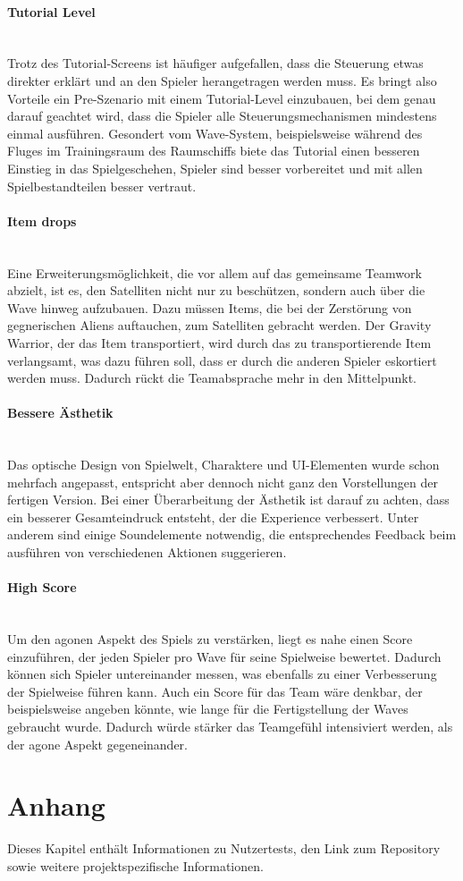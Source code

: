 \documentclass[11pt]{scrartcl}
\newcommand{\lbparagraph}[1]{\paragraph*{#1}\mbox{}\\}
\begin{document}
\lbparagraph{Tutorial Level}
Trotz des Tutorial-Screens ist häufiger aufgefallen, dass die Steuerung etwas direkter erklärt und an den Spieler
herangetragen werden muss. Es bringt also Vorteile ein Pre-Szenario mit einem Tutorial-Level einzubauen,
bei dem genau darauf geachtet wird, dass die Spieler alle Steuerungsmechanismen mindestens einmal ausführen.
Gesondert vom Wave-System, beispielsweise während des Fluges im Trainingsraum des Raumschiffs biete das Tutorial
einen besseren Einstieg in das Spielgeschehen, Spieler sind besser vorbereitet und mit allen Spielbestandteilen
besser vertraut.

\lbparagraph{Item drops}
Eine Erweiterungsmöglichkeit, die vor allem auf das gemeinsame Teamwork abzielt, ist es,
den Satelliten nicht nur zu beschützen, sondern auch über die Wave hinweg aufzubauen. Dazu
müssen Items, die bei der Zerstörung von gegnerischen Aliens auftauchen, zum Satelliten
gebracht werden. Der Gravity Warrior, der das Item transportiert, wird durch das zu
transportierende Item verlangsamt, was dazu führen soll, dass er durch die anderen Spieler
eskortiert werden muss. Dadurch rückt die Teamabsprache mehr in den Mittelpunkt.

\lbparagraph{Bessere Ästhetik}
Das optische Design von Spielwelt, Charaktere und UI-Elementen wurde schon mehrfach angepasst,
entspricht aber dennoch nicht ganz den Vorstellungen der fertigen Version. Bei einer Überarbeitung der Ästhetik ist
darauf zu achten, dass ein besserer Gesamteindruck entsteht, der die Experience verbessert. Unter anderem sind einige
Soundelemente notwendig, die entsprechendes Feedback beim ausführen von verschiedenen Aktionen suggerieren.

\lbparagraph{High Score}
Um den agonen Aspekt des Spiels zu verstärken, liegt es nahe einen Score einzuführen, der
jeden Spieler pro Wave für seine Spielweise bewertet. Dadurch können sich Spieler
untereinander messen, was ebenfalls zu einer Verbesserung der Spielweise führen kann.
Auch ein Score für das Team wäre denkbar, der beispielsweise angeben könnte, wie lange für
die Fertigstellung der Waves gebraucht wurde. Dadurch würde stärker das Teamgefühl
intensiviert werden, als der agone Aspekt gegeneinander.


\newpage
\section{Anhang}
\label{sec:appendix}
Dieses Kapitel enthält Informationen zu Nutzertests, den Link zum Repository sowie weitere projektspezifische Informationen.
\end{document}
